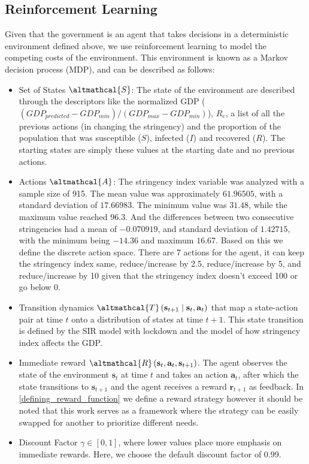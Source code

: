 \documentclass[tikz,fleqn,12pt]{wlscirep}
\begin{document}
\subsection{Reinforcement Learning}
Given that the government is an agent that takes decisions in a deterministic environment defined above, we use reinforcement learning to model the competing costs of the environment. This environment is known as a Markov decision process (MDP), and can be described as follows:
\begin{itemize}
    \item Set of States $\altmathcal{S}$: The state of the environment are described through the descriptors like the normalized GDP ($(GDP_{predicted} - GDP_{min}) / (GDP_{max} - GDP_{min})$), $R_e$, a list of all the previous actions (in changing the stringency) and the proportion of the population that was susceptible ($S$), infected ($I$) and recovered ($R$). The starting states are simply these values at the starting date and no previous actions.
    \item Actions $\altmathcal{A}$: The stringency index variable was analyzed with a sample size of 915. The mean value was approximately $61.96505$, with a standard deviation of $17.66983$. The minimum value was $31.48$, while the maximum value reached $96.3$. And the differences between two consecutive stringencies had a mean of $-0.070919$, and standard deviation of $1.42715$, with the minimum being $-14.36$ and maximum $16.67$. Based on this we define the discrete action space. There are 7 actions for the agent, it can keep the stringency index same, reduce/increase by 2.5, reduce/increase by 5, and reduce/increase by 10 given that the stringency index doesn't exceed 100 or go below 0.
    \item Transition dynamics $\altmathcal{T}\left(\mathbf{s}_{t+1} \mid \mathbf{s}_t, \mathbf{a}_t\right)$ that map a state-action pair at time $t$ onto a distribution of states at time $t+1$. This state transition is defined by the SIR model with lockdown and the model of how stringency index affects the GDP.
    \item Immediate reward $\altmathcal{R}\left(\mathbf{s}_t, \mathbf{a}_t, \mathbf{s}_{t+1}\right)$. The agent observes the state of the environment $\mathbf{s}_t$ at time $t$ and takes an action $\mathbf{a}_t$, after which the state transitions to $\mathbf{s}_{t+1}$ and the agent receives a reward $\mathbf{r}_{t+1}$ as feedback. In \cref{defining_reward_function} we define a reward strategy however it should be noted that this work serves as a framework where the strategy can be easily swapped for another to prioritize different needs.
    \item Discount Factor $\gamma \in[0,1]$, where lower values place more emphasis on immediate rewards. Here, we choose the default discount factor of 0.99.
\end{itemize}
\end{document}
